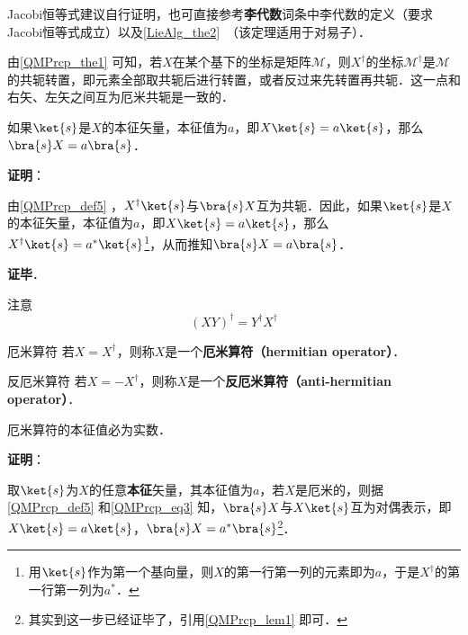Jacobi恒等式建议自行证明，也可直接参考\textbf{李代数}词条中李代数的定义（要求Jacobi恒等式成立）以及\autoref{LieAlg_the2}~（该定理适用于对易子）．




由\autoref{QMPrcp_the1} 可知，若$X$在某个基下的坐标是矩阵$\mathcal{M}$，则$X^\dagger$的坐标$\mathcal{M}^\dagger$是$\mathcal{M}$的共轭转置，即元素全部取共轭后进行转置，或者反过来先转置再共轭．这一点和右矢、左矢之间互为厄米共轭是一致的．






\begin{lemma}{}\label{QMPrcp_lem1}
如果$\ket{s}$是$X$的本征矢量，本征值为$a$，即$X\ket{s}=a\ket{s}$，那么$\bra{s}X=a\bra{s}$．
\end{lemma}

\textbf{证明}：

由\autoref{QMPrcp_def5} ，$X^\dagger\ket{s}$与$\bra{s}X$互为共轭．因此，如果$\ket{s}$是$X$的本征矢量，本征值为$a$，即$X\ket{s}=a\ket{s}$，那么$X^\dagger\ket{s}=a^*\ket{s}$\footnote{用$\ket{s}$作为第一个基向量，则$X$的第一行第一列的元素即为$a$，于是$X^\dagger$的第一行第一列为$a^*$．}，从而推知$\bra{s}X=a\bra{s}$．

\textbf{证毕}．




注意
\begin{equation}
(XY)^\dagger = Y^\dagger X^\dagger
\end{equation}


\begin{definition}{厄米算符}\label{QMPrcp_def12}
若$X=X^\dagger$，则称$X$是一个\textbf{厄米算符（hermitian operator）}．
\end{definition}

\begin{definition}{反厄米算符}\label{QMPrcp_def19}
若$X=-X^\dagger$，则称$X$是一个\textbf{反厄米算符（anti-hermitian operator）}．
\end{definition}

\begin{theorem}{}\label{QMPrcp_the2}
厄米算符的本征值必为实数．
\end{theorem}

\textbf{证明}：

取$\ket{s}$为$X$的任意\textbf{本征}矢量，其本征值为$a$，若$X$是厄米的，则据\autoref{QMPrcp_def5} 和\autoref{QMPrcp_eq3} 知，$\bra{s}X$与$X\ket{s}$互为对偶表示，即$X\ket{s}=a\ket{s}$，$\bra{s}X=a^*\bra{s}$\footnote{其实到这一步已经证毕了，引用\autoref{QMPrcp_lem1} 即可．}．

